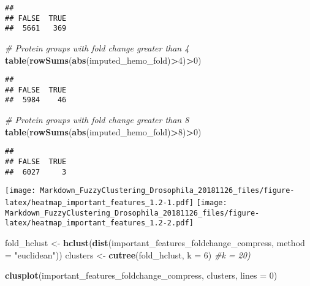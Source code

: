 \documentclass[]{article}
\newenvironment{Shaded}{\begin{snugshade}}{\end{snugshade}}
\newcommand{\KeywordTok}[1]{\textcolor[rgb]{0.13,0.29,0.53}{\textbf{#1}}}
\newcommand{\DataTypeTok}[1]{\textcolor[rgb]{0.13,0.29,0.53}{#1}}
\newcommand{\DecValTok}[1]{\textcolor[rgb]{0.00,0.00,0.81}{#1}}
\newcommand{\StringTok}[1]{\textcolor[rgb]{0.31,0.60,0.02}{#1}}
\newcommand{\CommentTok}[1]{\textcolor[rgb]{0.56,0.35,0.01}{\textit{#1}}}
\newcommand{\OperatorTok}[1]{\textcolor[rgb]{0.81,0.36,0.00}{\textbf{#1}}}
\newcommand{\NormalTok}[1]{#1}
\begin{document}
\begin{verbatim}
## 
## FALSE  TRUE 
##  5661   369
\end{verbatim}

\begin{Shaded}
\begin{Highlighting}[]
\CommentTok{# Protein groups with fold change greater than 4}
\KeywordTok{table}\NormalTok{(}\KeywordTok{rowSums}\NormalTok{(}\KeywordTok{abs}\NormalTok{(imputed_hemo_fold)}\OperatorTok{>}\DecValTok{4}\NormalTok{)}\OperatorTok{>}\DecValTok{0}\NormalTok{)}
\end{Highlighting}
\end{Shaded}

\begin{verbatim}
## 
## FALSE  TRUE 
##  5984    46
\end{verbatim}

\begin{Shaded}
\begin{Highlighting}[]
\CommentTok{# Protein groups with fold change greater than 8}
\KeywordTok{table}\NormalTok{(}\KeywordTok{rowSums}\NormalTok{(}\KeywordTok{abs}\NormalTok{(imputed_hemo_fold)}\OperatorTok{>}\DecValTok{8}\NormalTok{)}\OperatorTok{>}\DecValTok{0}\NormalTok{)}
\end{Highlighting}
\end{Shaded}

\begin{verbatim}
## 
## FALSE  TRUE 
##  6027     3
\end{verbatim}

\texttt{[image: Markdown\_FuzzyClustering\_Drosophila\_20181126\_files/figure-latex/heatmap\_important\_features\_1.2-1.pdf]}
\texttt{[image: Markdown\_FuzzyClustering\_Drosophila\_20181126\_files/figure-latex/heatmap\_important\_features\_1.2-2.pdf]}

\begin{Shaded}
\begin{Highlighting}[]
\NormalTok{fold_hclust <-}\StringTok{ }\KeywordTok{hclust}\NormalTok{(}\KeywordTok{dist}\NormalTok{(important_features_foldchange_compress, }\DataTypeTok{method =} \StringTok{"euclidean"}\NormalTok{))}
\NormalTok{clusters <-}\StringTok{ }\KeywordTok{cutree}\NormalTok{(fold_hclust, }\DataTypeTok{k =} \DecValTok{6}\NormalTok{) }\CommentTok{#k = 20)}

\KeywordTok{clusplot}\NormalTok{(important_features_foldchange_compress, clusters, }\DataTypeTok{lines =} \DecValTok{0}\NormalTok{)}
\end{Highlighting}
\end{Shaded}
\end{document}
